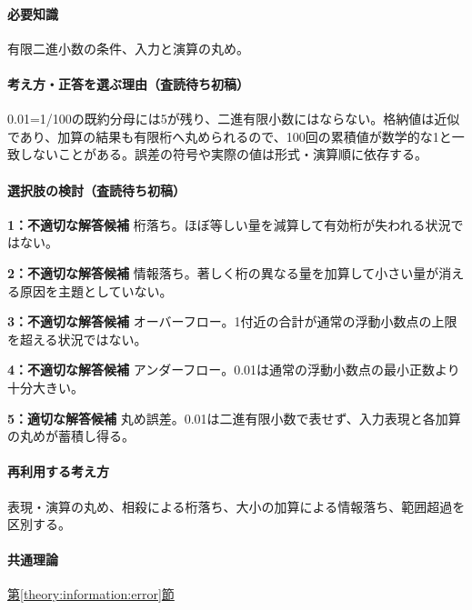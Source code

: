 \paragraph{必要知識} 有限二進小数の条件、入力と演算の丸め。

\paragraph{考え方・正答を選ぶ理由（査読待ち初稿）} 0.01=\allowbreak{}1/100の既約分母には5が残り、二進有限小数にはならない。格納値は近似であり、加算の結果も有限桁へ丸められるので、100回の累積値が数学的な1と一致しないことがある。誤差の符号や実際の値は形式・演算順に依存する。

\paragraph{選択肢の検討（査読待ち初稿）}\mbox{}\par

\noindent\textbf{1：不適切な解答候補} 桁落ち。ほぼ等しい量を減算して有効桁が失われる状況ではない。\par

\noindent\textbf{2：不適切な解答候補} 情報落ち。著しく桁の異なる量を加算して小さい量が消える原因を主題としていない。\par

\noindent\textbf{3：不適切な解答候補} オーバーフロー。1付近の合計が通常の浮動小数点の上限を超える状況ではない。\par

\noindent\textbf{4：不適切な解答候補} アンダーフロー。0.01は通常の浮動小数点の最小正数より十分大きい。\par

\noindent\textbf{5：適切な解答候補} 丸め誤差。0.01は二進有限小数で表せず、入力表現と各加算の丸めが蓄積し得る。\par

\paragraph{再利用する考え方} 表現・演算の丸め、相殺による桁落ち、大小の加算による情報落ち、範囲超過を区別する。

\paragraph{共通理論} \hyperref[theory:information:error]{第\ref*{theory:information:error}節}

